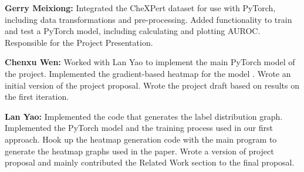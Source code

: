 \documentclass{amia}
\begin{document}
\textbf{Gerry Meixiong:} Integrated the CheXPert dataset for use with PyTorch, including data transformations and pre-processing. Added functionality to train and test a PyTorch model, including calculating and plotting AUROC. Responsible for the Project Presentation.

\textbf{Chenxu Wen:} Worked with Lan Yao to implement the main PyTorch model of the project. Implemented the  gradient-based heatmap for the model . Wrote an initial version of the project proposal. Wrote the project draft based on results on the first iteration.

\textbf{Lan Yao:} Implemented the code that generates the label distribution graph. Implemented the PyTorch model and the training process used in our first approach. Hook up the heatmap generation code with the main program to generate the heatmap graphs used in the paper. Wrote a version of project proposal and mainly contributed the Related Work section to the final proposal.

\small


\end{document}
